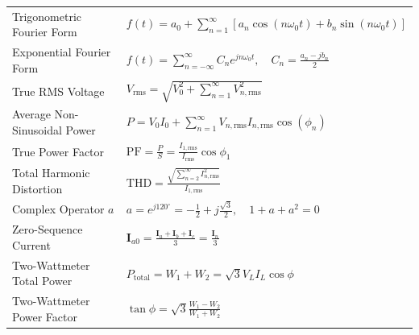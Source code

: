 \documentclass[12pt,a4paper]{article}
\renewcommand{\arraystretch}{1.45}
\begin{document}
\begin{tcolorbox}[formulabox, title={\textbf{Key Formulas and Network Relations at a Glance}}]
\renewcommand{\arraystretch}{1.35}
\begin{tabularx}{\linewidth}{B{5.0cm} X}
Trigonometric Fourier Form & $f(t) = a_0 + \sum_{n=1}^\infty [a_n \cos(n\omega_0 t) + b_n \sin(n\omega_0 t)]$ \\[4pt]
Exponential Fourier Form & $f(t) = \sum_{n=-\infty}^\infty C_n e^{j n \omega_0 t}, \quad C_n = \frac{a_n - j b_n}{2}$ \\[4pt]
True RMS Voltage & $V_{\text{rms}} = \sqrt{V_0^2 + \sum_{n=1}^\infty V_{n,\text{rms}}^2}$ \\[4pt]
Average Non-Sinusoidal Power & $P = V_0 I_0 + \sum_{n=1}^\infty V_{n,\text{rms}} I_{n,\text{rms}} \cos(\phi_n)$ \\[4pt]
True Power Factor & $\text{PF} = \frac{P}{S} = \frac{I_{1,\text{rms}}}{I_{\text{rms}}} \cos\phi_1$ \\[4pt]
Total Harmonic Distortion & $\text{THD} = \frac{\sqrt{\sum_{n=2}^\infty I_{n,\text{rms}}^2}}{I_{1,\text{rms}}}$ \\[4pt]
Complex Operator $a$ & $a = e^{j 120^\circ} = -\frac{1}{2} + j\frac{\sqrt{3}}{2}, \quad 1 + a + a^2 = 0$ \\[4pt]
Zero-Sequence Current & $\mathbf{I}_{a0} = \frac{\mathbf{I}_a + \mathbf{I}_b + \mathbf{I}_c}{3} = \frac{\mathbf{I}_n}{3}$ \\[4pt]
Two-Wattmeter Total Power & $P_{\text{total}} = W_1 + W_2 = \sqrt{3} V_L I_L \cos\phi$ \\[4pt]
Two-Wattmeter Power Factor & $\tan\phi = \sqrt{3} \frac{W_1 - W_2}{W_1 + W_2}$ \\[4pt]
\end{tabularx}
\end{tcolorbox}
\end{document}
